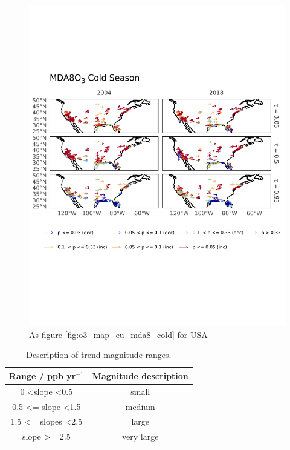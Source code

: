 \documentclass[journal abbreviation, manuscript]{copernicus}
\begin{document}
\begin{figure}[h!]
\centering
\includegraphics[height=0.9\textheight]{figures/paper_figures/o3_map/o3_map_piecewise_stats_freeTau_mda8_anom_cold_us_o3.pdf}
\caption{As figure \ref{fig:o3_map_eu_mda8_cold} for USA}
\label{fig:o3_map_us_mda8_cold}
\end{figure}

\begin{table}[h]
\caption{Description of trend magnitude ranges.}
\begin{tabular}{c|c}
Range / ppb yr$^{-1}$                 & Magnitude description \\ \hline
0 \textless slope \textless 0.5       & small                 \\
0.5 \textless{}= slope \textless 1.5  & medium              \\
1.5 \textless{}= slopes \textless 2.5 & large                 \\
slope \textgreater{}= 2.5             & very large           
\end{tabular}
\label{tab:magnitude_description_table}
\end{table}
\end{document}
